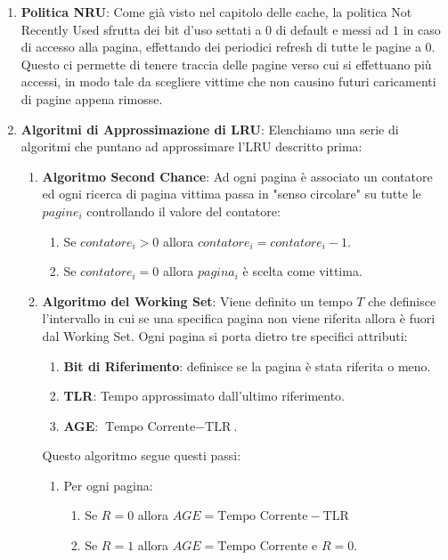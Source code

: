 \documentclass{article}
\begin{document}
\begin{enumerate}
    \item \textbf{Politica NRU}: Come già visto nel capitolo delle cache, la politica Not Recently Used sfrutta dei bit d'uso settati a $0$ di default e messi ad $1$ in caso di accesso alla pagina, effettando dei periodici refresh di tutte le pagine a $0$. Questo ci permette di tenere traccia delle pagine verso cui si effettuano più accessi, in modo tale da scegliere vittime che non causino futuri caricamenti di pagine appena rimosse.
    \item \textbf{Algoritmi di Approssimazione di LRU}: Elenchiamo una serie di algoritmi che puntano ad approssimare l'LRU descritto prima:
    \begin{enumerate}
        \item \textbf{Algoritmo Second Chance}: Ad ogni pagina è associato un contatore ed ogni ricerca di pagina vittima passa in "senso circolare" su tutte le $pagine_{i}$ controllando il valore del contatore:
        \begin{enumerate}
            \item Se $contatore_{i} > 0$ allora $contatore_{i} = contatore_{i} - 1 $.
            \item Se $contatore_{i} = 0$ allora $pagina_{i}$ è scelta come vittima.
        \end{enumerate}
\newpage
        \item \textbf{Algoritmo del Working Set}: Viene definito un tempo $T$ che definisce \\ l'intervallo in cui se una specifica pagina non viene riferita allora è fuori dal Working Set. Ogni pagina si porta dietro tre specifici attributi:
        \begin{enumerate}
            \item \textbf{Bit di Riferimento}: definisce se la pagina è stata riferita o meno.
            \item \textbf{TLR}: Tempo approssimato dall'ultimo riferimento.
            \item \textbf{AGE}: $\text{Tempo Corrente} - \text{TLR}$.
        \end{enumerate}
        Questo algoritmo segue questi passi:
        \begin{enumerate}
            \item Per ogni pagina:
            \begin{enumerate}
                \item Se $R=0$ allora $AGE = \text{Tempo Corrente} - \text{TLR} $
                \item Se $R=1$ allora $AGE = \text{Tempo Corrente}$ e $R = 0$.

\end{enumerate}
\end{enumerate}
\end{enumerate}
\end{enumerate}
\end{document}
